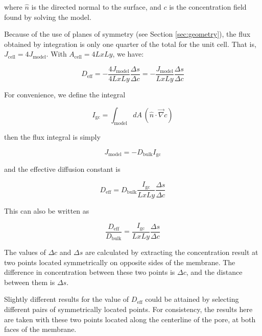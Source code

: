 \documentclass{article}
\begin{document}
where $\hat{n}$ is the directed normal to the surface,
and $c$ is the concentration field found by solving the model.

Because of the use of planes of symmetry (see Section \ref{sec:geometry}),
the flux obtained by integration is only one quarter of the total for the unit cell.
That is, $J_{\mathrm{cell}} = 4 J_{\mathrm{model}}$.
With $A_{\mathrm{cell}} = 4 Lx Ly$, we have:

\begin{equation}
D_{\mathrm{eff}} = - \frac{4 J_{\mathrm{model}}}{4 Lx Ly} \frac{\Delta s}{\Delta c}
 = - \frac{J_{\mathrm{model}}}{Lx Ly} \frac{\Delta s}{\Delta c}
\end{equation}

For convenience, we define the integral

\begin{equation}
I_{\mathrm{gc}} = \int_{\mathrm{model}} dA\, \left(\hat{n} \cdot \vec{\nabla} c \right)
\end{equation}

then the flux integral is simply

\begin{equation}
J_{\mathrm{model}} = - D_{\mathrm{bulk}} I_\mathrm{gc}
\end{equation}

and the effective diffusion constant is

\begin{equation}
D_{\mathrm{eff}} = D_{\mathrm{bulk}} \frac{I_\mathrm{gc}}{Lx Ly} \frac{\Delta s}{\Delta c}
\end{equation}

This can also be written as

\begin{equation}
\frac{D_{\mathrm{eff}}}{D_{\mathrm{bulk}}} = \frac{I_\mathrm{gc}}{Lx Ly} \frac{\Delta s}{\Delta c}
\end{equation}

The values of $\Delta c$ and $\Delta s$ are calculated by extracting
the concentration result at two points located symmetrically on opposite sides of the membrane.
The difference in concentration between these two points is $\Delta c$,
and the distance between them is $\Delta s$.

Slightly different results for the value of $D_{\mathrm{eff}}$ could be attained by selecting different
pairs of symmetrically located points.
For consistency, the results here are taken with these two points located
along the centerline of the pore, at both faces of the membrane.
\end{document}
